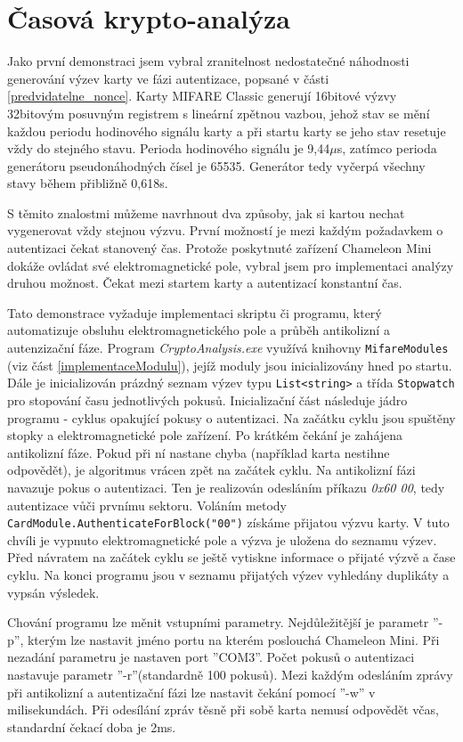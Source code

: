 \section{Časová krypto-analýza}
\label{casovaKryptoanalyza}
Jako první demonstraci jsem vybral zranitelnost nedostatečné náhodnosti generování výzev karty ve fázi autentizace, popsané v části \ref{predvidatelne_nonce}. Karty MIFARE Classic generují 16bitové výzvy 32bitovým posuvným registrem s lineární zpětnou vazbou, jehož stav se mění každou periodu hodinového signálu karty a při startu karty se jeho stav resetuje vždy do stejného stavu. Perioda hodinového signálu je 9,44$\mu$s, zatímco perioda generátoru pseudonáhodných čísel je 65535. Generátor tedy vyčerpá všechny stavy během přibližně 0,618s. \par
S těmito znalostmi můžeme navrhnout dva způsoby, jak si kartou nechat vygenerovat vždy stejnou výzvu. První možností je mezi každým požadavkem o autentizaci čekat stanovený čas. Protože poskytnuté zařízení Chameleon Mini dokáže ovládat své elektromagnetické pole, vybral jsem pro implementaci analýzy druhou možnost. Čekat mezi startem karty a autentizací konstantní čas.\par
Tato demonstrace vyžaduje implementaci skriptu či programu, který automatizuje obsluhu elektromagnetického pole a průběh antikolizní a autenzizační fáze. Program \emph{CryptoAnalysis.exe} využívá knihovny \verb|MifareModules| (viz část \ref{implementaceModulu}), jejíž moduly jsou inicializovány hned po startu. Dále je inicializován prázdný seznam výzev typu \verb|List<string>| a třída \verb|Stopwatch| pro stopování času jednotlivých pokusů. Inicializační část následuje jádro programu - cyklus opakující pokusy o autentizaci. Na začátku cyklu jsou spuštěny stopky a elektromagnetické pole zařízení. Po krátkém čekání je zahájena antikolizní fáze. Pokud při ní nastane chyba (například karta nestihne odpovědět), je algoritmus vrácen zpět na začátek cyklu. Na antikolizní fázi navazuje pokus o autentizaci. Ten je realizován odesláním příkazu \emph{0x60 00}, tedy autentizace vůči prvnímu sektoru. Voláním metody \verb|CardModule.AuthenticateForBlock("00")| získáme přijatou výzvu karty. V tuto chvíli je vypnuto elektromagnetické pole a výzva je uložena do seznamu výzev. Před návratem na začátek cyklu se ještě vytiskne informace o přijaté výzvě a čase cyklu. Na konci programu jsou v seznamu přijatých výzev vyhledány duplikáty a vypsán výsledek. \par
Chování programu lze měnit vstupními parametry. Nejdůležitější je parametr ''-p'', kterým lze nastavit jméno portu na kterém poslouchá Chameleon Mini. Při nezadání parametru je nastaven port ''COM3''. Počet pokusů o autentizaci nastavuje parametr ''-r''(standardně 100 pokusů). Mezi každým odesláním zprávy při antikolizní a autentizační fázi lze nastavit čekání pomocí ''-w'' v milisekundách. Při odesílání zpráv těsně při sobě karta nemusí odpovědět včas, standardní čekací doba je 2ms. 

